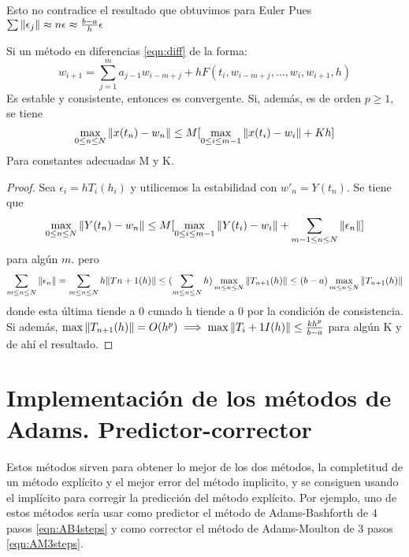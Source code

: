 \begin{remark}
    Esto no contradice el resultado que obtuvimos para Euler%
    Pues $\sum\norm{\epsilon_j} \approx n\epsilon \approx \frac{b-a}{h}\epsilon$%
\end{remark}

\begin{theorem}
    Si un método en diferencias \ref{eqn:diff} de la forma:
    \begin{equation}
        w_{i+1} = \sum_{j=1}^m {a_{j-1}w_{i-m+j}} + h F(t_i,w_{i-m+j}, \dots, w_i,w_{i+1},h)
    \end{equation}
    Es estable y consistente, entonces es convergente.
    Si, además, es de orden $p \geq 1$, se tiene
    \begin{equation}
        \max_{0 \leq n \leq N}\norm{x(t_n) - w_n} \leq M[
            \max_{0 \leq i \leq m-1} \norm{x(t_i) - w_i} + Kh
            ]
    \end{equation} 
    Para constantes adecuadas M y K.
    \begin{proof}
        Sea $\epsilon_i = hT_i(h_i)$ y utilicemos la estabilidad 
        con $w'_n = Y(t_n)$. Se tiene que 
        \begin{equation}
            \max_{0 \leq n \leq N}\norm{Y(t_n) - w_n} \leq M[
                \max_{0 \leq i \leq m-1}\norm{Y(t_i) - w_i} + \sum_{m-1\leq n \leq N}\norm{\epsilon_n}
                ]
        \end{equation}
        para algún $m$. pero
        \begin{equation}
            \sum_{m \leq n \leq N} \norm{\epsilon_n} = 
            \sum_{m \leq n \leq N} h\norm{Tn+1(h)} \leq
            (\sum_{m \leq n \leq N} h) \max_{m \leq n \leq N}\norm{T_{n+1}(h)} \leq
            (b-a)\max_{m \leq n \leq N}\norm{T_{n+1}(h)} 
        \end{equation}
        donde esta última tiende a 0 cunado h tiende a 0 por la condición de consistencia.
        Si además, $\max\norm{T_{n+1}(h)} = O(h^p) \implies \max\norm{T_i+1I(h)} \leq \frac{kh^p}{b-a}$
        para algún K y de ahí el resultado.
    \end{proof}
\end{theorem}

\section{Implementación de los métodos de Adams. Predictor-corrector}
Estos métodos sirven para obtener lo mejor de los dos métodos,
la completitud de un método explícito y el mejor error del 
método implicito, y se consiguen usando el implícito para corregir
la predicción del método explícito. Por ejemplo, uno de estos métodos 
sería usar como predictor el método de Adams-Bashforth de $4$ pasos \cref{eqn:AB4steps}
y como corrector el método de Adams-Moulton de $3$ pasos \cref{eqn:AM3steps}.


